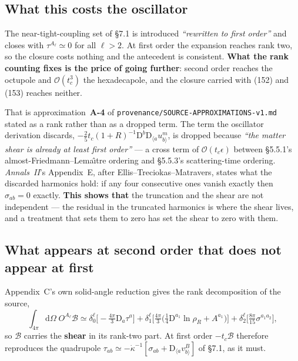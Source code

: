 \subsection{What this costs the oscillator}

The near-tight-coupling set of \S7.1 is introduced \emph{``rewritten to first
order''} and closes with $\tau^{A_\ell}\simeq0$ for all $\ell>2$. At first
order the expansion reaches rank two, so the closure costs nothing and the
antecedent is consistent. \textbf{What the rank counting fixes is the price of
going further}: second order reaches the octupole and
$\mathcal O(t_c^3)$ the hexadecapole, and the closure carried with (152) and
(153) reaches neither.

That is approximation~\textbf{A-4} of
\texttt{provenance/SOURCE-APPROXIMATIONS-v1.md} stated as a rank rather than as
a dropped term. The term the oscillator derivation discards,
$-\tfrac25 t_c(1+R)^{-1}\mathrm D^b\mathrm D_{\langle a}u^m_{b\rangle}$, is
dropped because \emph{``the matter shear is already at least first order''} ---
a cross term of $\mathcal O(t_c\epsilon)$ between \S5.5.1's almost-Friedmann--Lema\^{\i}tre
ordering and \S5.5.3's scattering-time ordering. \emph{Annals~II}'s
Appendix~E, after Ellis--Treciokas--Matravers, states what the discarded
harmonics hold: if any four consecutive ones vanish exactly then
$\sigma_{ab}=0$ exactly. \textbf{This shows that} the truncation and the shear
are not independent --- the residual in the truncated harmonics is where the
shear lives, and a treatment that sets them to zero has set the shear to zero
with them.

\subsection{What appears at second order that does not appear at first}

Appendix~C's own solid-angle reduction gives the rank decomposition of the
source,
\begin{equation}
  \int_{4\pi}\!\mathrm d\Omega\;O^{A_\ell}\mathcal B\simeq
  \delta^\ell_0\Big[-\tfrac{4\pi}{3}\mathrm D_a\tau^a\Big]
  +\delta^\ell_1\Big[\tfrac{4\pi}{3}\big(\tfrac14\mathrm D^{a_1}\ln\rho_R+A^{a_1}\big)\Big]
  +\delta^\ell_2\Big[\tfrac{8\pi}{15}\sigma^{a_1a_2}\Big],
  \label{eq:b-ranks}
\end{equation}
so $\mathcal B$ carries the \textbf{shear} in its rank-two part. At first order
$-t_c\mathcal B$ therefore reproduces the quadrupole
$\tau_{ab}\simeq-\dot\kappa^{-1}[\sigma_{ab}+\mathrm D_{\langle a}v_{b\rangle}^B]$
of \S7.1, as it must.

